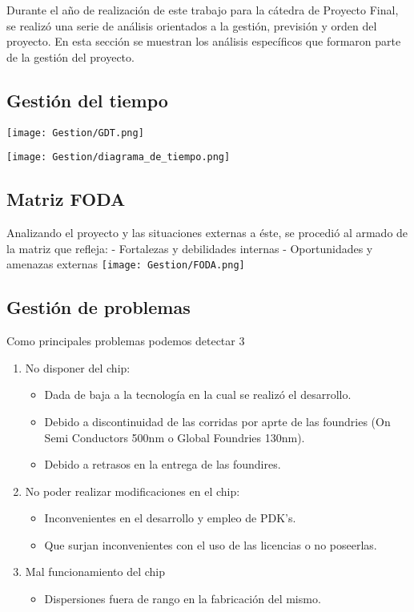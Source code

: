 Durante el año de realización de este trabajo para la cátedra de Proyecto Final, se realizó una serie de análisis orientados a la gestión, previsión y orden del proyecto.
En esta sección se muestran los análisis específicos que formaron parte de la gestión del proyecto.



\subsection{Gestión del tiempo}
\label{sec:tiempo}
{\centering
	\texttt{[image: Gestion/GDT.png]}
}
\newline
\newline

\label{sec:tiempo}
{\centering
    \texttt{[image: Gestion/diagrama\_de\_tiempo.png]}
}
\newpage
\subsection{Matriz FODA}
\label{sec:FODA}
Analizando el proyecto y las situaciones externas a éste, se procedió al armado de la matriz que refleja: \newline 
- Fortalezas y debilidades internas \newline  
- Oportunidades y amenazas externas \newline
{\centering
	\texttt{[image: Gestion/FODA.png]}
}


\subsection{Gestión de problemas}
\label{sec:problemas}
Como principales problemas podemos detectar 3
\begin{enumerate}
\item No disponer del chip:
	\begin{itemize}
    	\item Dada de baja a la tecnología en la cual se realizó el desarrollo.
		\item Debido a discontinuidad de las corridas por aprte de las foundries (On Semi Conductors 500nm o Global Foundries 130nm).
		\item Debido a retrasos en la entrega de las foundires.
	\end{itemize}
\item No poder realizar modificaciones en el chip:
    \begin{itemize}
    	\item Inconvenientes en el desarrollo y empleo de PDK's.
		\item Que surjan inconvenientes con el uso de las licencias o no poseerlas.
    \end{itemize}
\item Mal funcionamiento del chip
	\begin{itemize}
        \item Dispersiones fuera de rango en la fabricación del mismo. 
	\end{itemize}
\end{enumerate}

